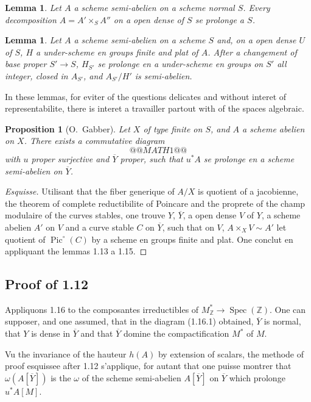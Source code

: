 \documentclass[12pt,a4paper]{article}
\theoremstyle{plain}
\newtheorem{lemma}[theorem]{Lemma}
\newtheorem{proposition}[theorem]{Proposition}
\theoremstyle{definition}
\theoremstyle{remark}
\DeclareMathOperator{\Spec}{Spec}
\DeclareMathOperator{\Pic}{Pic}
\newcommand{\ZZ}{\mathbb{Z}}
\providecommand{\ZZ}{\mathbb{Z}}
\providecommand{\Spec}{\operatorname{Spec}}
\begin{document}
\begin{lemma}
Let $A$ a scheme semi-abelien on a scheme normal $S$. Every decomposition $A = A' \times_S A''$ on a open dense of $S$ se prolonge a $S$.
\end{lemma}

\begin{lemma}
Let $A$ a scheme semi-abelien on a scheme $S$ and, on a open dense $U$ of $S$, $H$ a under-scheme en groups finite and plat of $A$. After a changement of base proper $S' \to S$, $H_{S'}$ se prolonge en a under-scheme en groups on $S'$ all integer, closed in $A_{S'}$, and $A_{S'}/H'$ is semi-abelien.
\end{lemma}

In these lemmas, for eviter of the questions delicates and without interet of representabilite, there is interet a travailler partout with of the spaces algebraic.

\begin{proposition}[O.~Gabber]
Let $X$ of type finite on $S$, and $A$ a scheme abelien on $X$. There exists a commutative diagram
\[
@@MATH1@@
\]
with $u$ proper surjective and $\overline{Y}$ proper, such that $u^*A$ se prolonge en a scheme semi-abelien on $\overline{Y}$.
\end{proposition}

\begin{proof}[Esquisse]
Utilisant that the fiber generique of $A/X$ is quotient of a jacobienne, the theorem of complete reductibilite of Poincare and the proprete of the champ modulaire of the curves stables, one trouve $Y$, $\overline{Y}$, a open dense $V$ of $Y$, a scheme abelien $A'$ on $V$ and a curve stable $C$ on $\overline{Y}$, such that on $V$, $A \times_X V \sim A'$ let quotient of $\Pic^\circ(C)$ by a scheme en groups finite and plat. One conclut en appliquant the lemmas 1.13 a 1.15.
\end{proof}

\subsection{Proof of 1.12}

Appliquons 1.16 to the composantes irreductibles of $M^*_{\ZZ} \to \Spec(\ZZ)$. One can supposer, and one assumed, that in the diagram (1.16.1) obtained, $\overline{Y}$ is normal, that $Y$ is dense in $\overline{Y}$ and that $\overline{Y}$ domine the compactification $M^*$ of $M$.

Vu the invariance of the hauteur $h(A)$ by extension of scalars, the methode of proof esquissee after 1.12 s'applique, for autant that one puisse montrer that $\omega(A[\overline{Y}])$ is the $\omega$ of the scheme semi-abelien $A[\overline{Y}]$ on $\overline{Y}$ which prolonge $u^*A[M]$.
\end{document}
